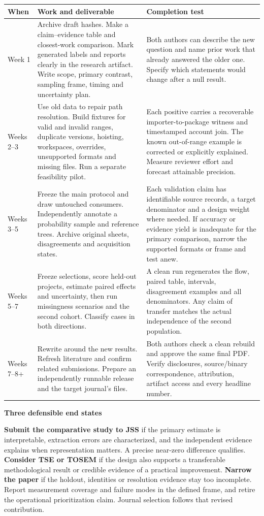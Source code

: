 \documentclass[11pt,a4paper]{article}
\newcommand{\hd}[1]{\par\textbf{\color{accent}#1}\par\nopagebreak}
\begin{document}
\small
\begin{tabularx}{\linewidth}{@{}p{.14\linewidth}XX@{}}
\toprule
When & Work and deliverable & Completion test\\\midrule
Week 1 & Archive draft hashes. Make a claim--evidence table and closest-work comparison. Mark generated labels and reports clearly in the research artifact. Write scope, primary contrast, sampling frame, timing and uncertainty plan. & Both authors can describe the new question and name prior work that already answered the older one. Specify which statements would change after a null result.\\
Weeks 2--3 & Use old data to repair path resolution. Build fixtures for valid and invalid ranges, duplicate versions, hoisting, workspaces, overrides, unsupported formats and missing files. Run a separate feasibility pilot. & Each positive carries a recoverable importer-to-package witness and timestamped account join. The known out-of-range example is corrected or explicitly explained. Measure reviewer effort and forecast attainable precision.\\
Weeks 3--5 & Freeze the main protocol and draw untouched consumers. Independently annotate a probability sample and reference trees. Archive original sheets, disagreements and acquisition states. & Each validation claim has identifiable source records, a target denominator and a design weight where needed. If accuracy or evidence yield is inadequate for the primary comparison, narrow the supported formats or frame and test anew.\\
Weeks 5--7 & Freeze selections, score held-out projects, estimate paired effects and uncertainty, then run missingness scenarios and the second cohort. Classify cases in both directions. & A clean run regenerates the flow, paired table, intervals, disagreement examples and all denominators. Any claim of transfer matches the actual independence of the second population.\\
Weeks 7--8+ & Rewrite around the new results. Refresh literature and confirm related submissions. Prepare an independently runnable release and the target journal's files. & Both authors check a clean rebuild and approve the same final PDF. Verify disclosures, source/binary correspondence, attribution, artifact access and every headline number.\\
\bottomrule
\end{tabularx}
\normalsize
\hd{Three defensible end states}
\textbf{Submit the comparative study to JSS} if the primary estimate is interpretable, extraction errors are characterized, and the independent evidence explains when representation matters. A precise near-zero difference qualifies. \textbf{Consider TSE or TOSEM} if the design also supports a transferable methodological result or credible evidence of a practical improvement. \textbf{Narrow the paper} if the holdout, identities or resolution evidence stay too incomplete. Report measurement coverage and failure modes in the defined frame, and retire the operational prioritization claim. Journal selection follows that revised contribution.
\end{document}
